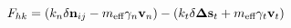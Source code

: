 \documentclass[12pt]{article}
\begin{document}
$$
   F_{hk} = (k_n \delta \mathbf{n}_{ij} -  
   m_{\mbox{\scriptsize{eff}}} \gamma_n\mathbf{ v}_n) - 
   (k_t \delta\mathbf{ \Delta s}_t +
   m_{\mbox{\scriptsize{eff}}} \gamma_t \mathbf{v}_t)
$$
\end{document}
